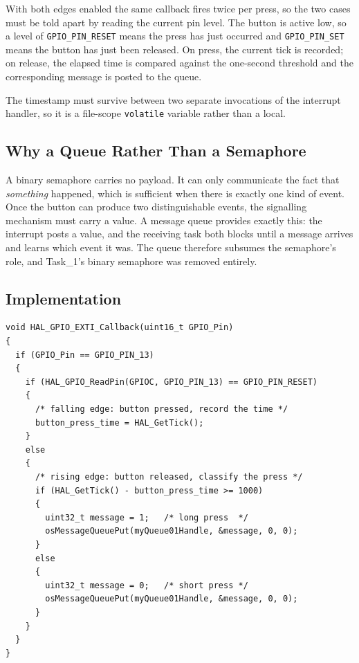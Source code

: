 \documentclass[11pt,a4paper]{article}
\begin{document}
With both edges enabled the same callback fires twice per press, so the two
cases must be told apart by reading the current pin level. The button is
active low, so a level of \texttt{GPIO\_PIN\_RESET} means the press has just
occurred and \texttt{GPIO\_PIN\_SET} means the button has just been released.
On press, the current tick is recorded; on release, the elapsed time is
compared against the one-second threshold and the corresponding message is
posted to the queue.

The timestamp must survive between two separate invocations of the interrupt
handler, so it is a file-scope \texttt{volatile} variable rather than a local.

\subsection{Why a Queue Rather Than a Semaphore}

A binary semaphore carries no payload. It can only communicate the fact that
\emph{something} happened, which is sufficient when there is exactly one kind
of event. Once the button can produce two distinguishable events, the
signalling mechanism must carry a value. A message queue provides exactly
this: the interrupt posts a value, and the receiving task both blocks until a
message arrives and learns which event it was. The queue therefore subsumes
the semaphore's role, and Task\_1's binary semaphore was removed entirely.

\subsection{Implementation}

\begin{lstlisting}[caption={EXTI callback: classifying press duration and posting a message.}]
void HAL_GPIO_EXTI_Callback(uint16_t GPIO_Pin)
{
  if (GPIO_Pin == GPIO_PIN_13)
  {
    if (HAL_GPIO_ReadPin(GPIOC, GPIO_PIN_13) == GPIO_PIN_RESET)
    {
      /* falling edge: button pressed, record the time */
      button_press_time = HAL_GetTick();
    }
    else
    {
      /* rising edge: button released, classify the press */
      if (HAL_GetTick() - button_press_time >= 1000)
      {
        uint32_t message = 1;   /* long press  */
        osMessageQueuePut(myQueue01Handle, &message, 0, 0);
      }
      else
      {
        uint32_t message = 0;   /* short press */
        osMessageQueuePut(myQueue01Handle, &message, 0, 0);
      }
    }
  }
}
\end{lstlisting}
\end{document}
